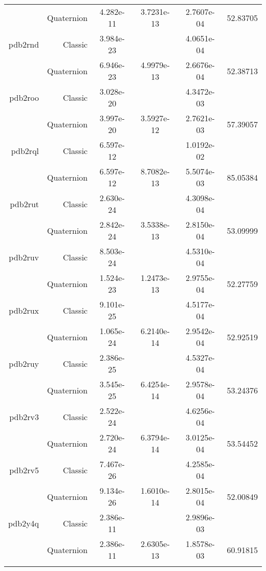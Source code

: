 \begin{xltabular}{\textwidth}{r|rS[table-format=1.3e+2]S[table-format=1.4e+2]S[table-format=1.4e+2]S[table-format=-1.5]}
& Quaternion & 4.282e-11 & 3.7231e-13 & 2.7607e-04 & 52.83705\\  \addlinespace
pdb2rnd & Classic & 3.984e-23 &  & 4.0651e-04 & \\
& Quaternion & 6.946e-23 & 4.9979e-13 & 2.6676e-04 & 52.38713\\  \addlinespace
pdb2roo & Classic & 3.028e-20 &  & 4.3472e-03 & \\
& Quaternion & 3.997e-20 & 3.5927e-12 & 2.7621e-03 & 57.39057\\  \addlinespace
pdb2rql & Classic & 6.597e-12 &  & 1.0192e-02 & \\
& Quaternion & 6.597e-12 & 8.7082e-13 & 5.5074e-03 & 85.05384\\  \addlinespace
pdb2rut & Classic & 2.630e-24 &  & 4.3098e-04 & \\
& Quaternion & 2.842e-24 & 3.5338e-13 & 2.8150e-04 & 53.09999\\  \addlinespace
pdb2ruv & Classic & 8.503e-24 &  & 4.5310e-04 & \\
& Quaternion & 1.524e-23 & 1.2473e-13 & 2.9755e-04 & 52.27759\\  \addlinespace
pdb2rux & Classic & 9.101e-25 &  & 4.5177e-04 & \\
& Quaternion & 1.065e-24 & 6.2140e-14 & 2.9542e-04 & 52.92519\\  \addlinespace
pdb2ruy & Classic & 2.386e-25 &  & 4.5327e-04 & \\
& Quaternion & 3.545e-25 & 6.4254e-14 & 2.9578e-04 & 53.24376\\  \addlinespace
pdb2rv3 & Classic & 2.522e-24 &  & 4.6256e-04 & \\
& Quaternion & 2.720e-24 & 6.3794e-14 & 3.0125e-04 & 53.54452\\  \addlinespace
pdb2rv5 & Classic & 7.467e-26 &  & 4.2585e-04 & \\
& Quaternion & 9.134e-26 & 1.6010e-14 & 2.8015e-04 & 52.00849\\  \addlinespace
pdb2y4q & Classic & 2.386e-11 &  & 2.9896e-03 & \\
& Quaternion & 2.386e-11 & 2.6305e-13 & 1.8578e-03 & 60.91815\\  \addlinespace
\end{xltabular}
